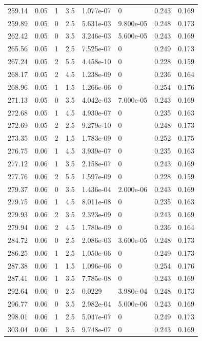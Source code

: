 \documentclass[preview]{standalone}
\begin{document}
{{{{\begin{tabular}{L{1.2cm}C{1.2cm} C{0.3cm}C{0.5cm} C{1.4cm}C{1.4cm} C{1.4cm}C{1.4cm}}
  259.14  &  0.05  & 1     & 3.5 &  1.077e-07  & 0  & 0.243 &  0.169   \\ 
  259.89  &  0.05  & 0     & 2.5 &  5.631e-03  & 9.800e-05  & 0.248 &  0.173   \\ 
  262.42  &  0.05  & 0     & 3.5 &  3.246e-03  & 5.600e-05  & 0.243 &  0.169   \\ 
  265.56  &  0.05  & 1     & 2.5 &  7.525e-07  & 0  & 0.249 &  0.173   \\ 
  267.24  &  0.05  & 2     & 5.5 &  4.458e-10  & 0  & 0.228 &  0.159   \\ 
  268.17  &  0.05  & 2     & 4.5 &  1.238e-09  & 0  & 0.236 &  0.164   \\ 
  268.96  &  0.05  & 1     & 1.5 &  1.266e-06  & 0  & 0.254 &  0.176   \\ 
  271.13  &  0.05  & 0     & 3.5 &  4.042e-03  & 7.000e-05  & 0.243 &  0.169   \\ 
  272.68  &  0.05  & 1     & 4.5 &  4.930e-07  & 0  & 0.235 &  0.163   \\ 
  272.69  &  0.05  & 2     & 2.5 &  9.279e-10  & 0  & 0.248 &  0.173   \\ 
  273.35  &  0.05  & 2     & 1.5 &  1.783e-09  & 0  & 0.252 &  0.175   \\ 
  276.75  &  0.06  & 1     & 4.5 &  3.939e-07  & 0  & 0.235 &  0.163   \\ 
  277.12  &  0.06  & 1     & 3.5 &  2.158e-07  & 0  & 0.243 &  0.169   \\ 
  277.76  &  0.06  & 2     & 5.5 &  1.597e-09  & 0  & 0.228 &  0.159   \\ 
  279.37  &  0.06  & 0     & 3.5 &  1.436e-04  & 2.000e-06  & 0.243 &  0.169   \\ 
  279.75  &  0.06  & 1     & 4.5 &  8.011e-08  & 0  & 0.235 &  0.163   \\ 
  279.93  &  0.06  & 2     & 3.5 &  2.323e-09  & 0  & 0.243 &  0.169   \\ 
  279.94  &  0.06  & 2     & 4.5 &  1.780e-09  & 0  & 0.236 &  0.164   \\ 
  284.72  &  0.06  & 0     & 2.5 &  2.086e-03  & 3.600e-05  & 0.248 &  0.173   \\ 
  286.25  &  0.06  & 1     & 2.5 &  1.050e-06  & 0  & 0.249 &  0.173   \\ 
  287.38  &  0.06  & 1     & 1.5 &  1.096e-06  & 0  & 0.254 &  0.176   \\ 
  287.41  &  0.06  & 1     & 3.5 &  7.785e-08  & 0  & 0.243 &  0.169   \\ 
  292.64  &  0.06  & 0     & 2.5 &  0.0229  & 3.980e-04  & 0.248 &  0.173   \\ 
  296.77  &  0.06  & 0     & 3.5 &  2.982e-04  & 5.000e-06  & 0.243 &  0.169   \\ 
  298.01  &  0.06  & 1     & 2.5 &  5.047e-07  & 0  & 0.249 &  0.173   \\ 
  303.04  &  0.06  & 1     & 3.5 &  9.748e-07  & 0  & 0.243 &  0.169   \\ 
\hline 
\end{tabular} 

}}}}
\end{document}
